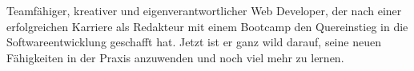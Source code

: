 

\begin{cvparagraph}

Teamfähiger, kreativer und eigenverantwortlicher Web Developer, der nach einer erfolgreichen Karriere als Redakteur mit einem Bootcamp den Quereinstieg in die Softwareentwicklung geschafft hat. Jetzt ist er ganz wild darauf, seine neuen Fähigkeiten in der Praxis anzuwenden und noch viel mehr zu lernen.
\end{cvparagraph}
